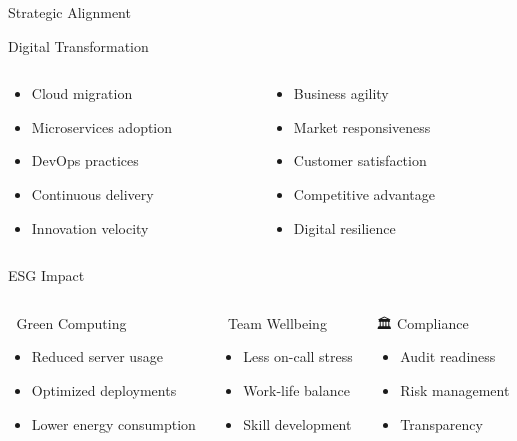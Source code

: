 \documentclass[presentation,aspectratio=169]{beamer}
\begin{document}
\begin{frame}[label={sec:org38db7a0}]{Strategic Alignment}
\begin{block}{Digital Transformation}
\begin{columns}
\begin{column}{0.5\columnwidth}
\begin{itemize}
\item Cloud migration
\item Microservices adoption
\item DevOps practices
\item Continuous delivery
\item Innovation velocity
\end{itemize}
\end{column}
\begin{column}{0.5\columnwidth}
\begin{itemize}
\item Business agility
\item Market responsiveness
\item Customer satisfaction
\item Competitive advantage
\item Digital resilience
\end{itemize}
\end{column}
\end{columns}
\end{block}
\begin{block}{ESG Impact}
\begin{columns}
\begin{column}{0.33\columnwidth}
🌱 \alert{Green Computing}
\begin{itemize}
\item Reduced server usage
\item Optimized deployments
\item Lower energy consumption
\end{itemize}
\end{column}
\begin{column}{0.33\columnwidth}
👥 \alert{Team Wellbeing}
\begin{itemize}
\item Less on-call stress
\item Work-life balance
\item Skill development
\end{itemize}
\end{column}
\begin{column}{0.34\columnwidth}
🏛 \alert{Compliance}
\begin{itemize}
\item Audit readiness
\item Risk management
\item Transparency
\end{itemize}
\end{column}
\end{columns}
\end{block}
\end{frame}
\end{document}
